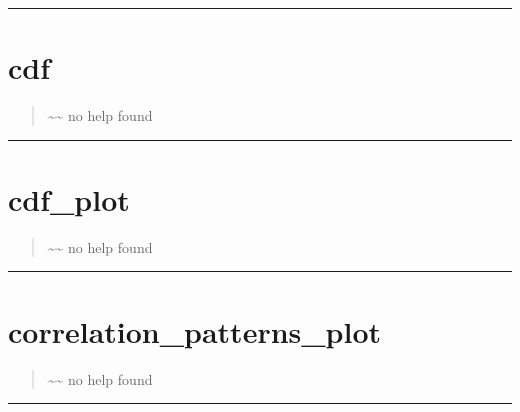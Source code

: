 \documentclass[letterpaper,10pt,english]{sphinxmanual}
\begin{document}
\bigskip\hrule{}\bigskip



\section{cdf}
\label{classes/utils/@mcf/mcf:cdf}\label{classes/utils/@mcf/mcf:id2}\begin{quote}

\textasciitilde{}\textasciitilde{} no help found
\end{quote}


\bigskip\hrule{}\bigskip



\section{cdf\_plot}
\label{classes/utils/@mcf/mcf:id3}\label{classes/utils/@mcf/mcf:cdf-plot}\begin{quote}

\textasciitilde{}\textasciitilde{} no help found
\end{quote}


\bigskip\hrule{}\bigskip



\section{correlation\_patterns\_plot}
\label{classes/utils/@mcf/mcf:correlation-patterns-plot}\label{classes/utils/@mcf/mcf:id4}\begin{quote}

\textasciitilde{}\textasciitilde{} no help found
\end{quote}


\bigskip\hrule{}\bigskip
\end{document}
